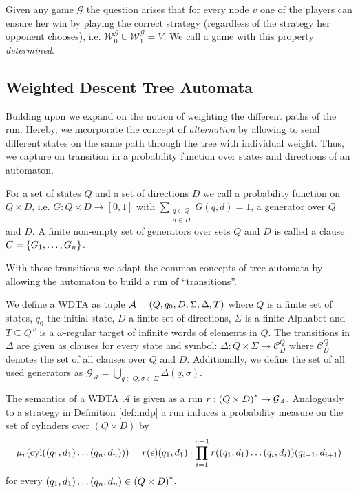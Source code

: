 Given any game $\mathcal{G}$ the question arises that for every node $v$ one of
the players can ensure her win by playing the correct strategy (regardless of
the strategy her opponent chooses), i.e.
$\mathcal{W}^{\mathcal{G}}_{0}\cup\mathcal{W}^{\mathcal{G}}_{1} = V$. We call
a game with this property \emph{determined}.

\subsection{Weighted Descent Tree Automata}
Building upon \cite{RandAutoInfTrees} we expand on the notion of weighting
the different paths of the run. Hereby, we incorporate the concept of
\emph{alternation} by allowing to send different states on the same path
through the tree with individual weight. Thus, we capture on transition in a
probability function over states and directions of an automaton.
\begin{definition}[Generator]
  For a set of states $Q$ and a set of directions $D$ we call a probability
  function on $Q\times D$, i.e. $G: Q\times D\rightarrow [0,1]$ with
  $\sum\limits_{\substack{q\in Q\\ d\in D}}G(q,d) = 1$, a generator over $Q$
  and $D$. A finite non-empty set of generators over sets $Q$ and $D$ is called
  a clause $C = \left\{G_{1},\dots,G_{n}\right\}$.
\end{definition}
With these transitions we adapt the common concepts of tree automata by
allowing the automaton to build a run of \enquote{transitions}.
\begin{definition}
  We define a \acl{WDTA} as tuple
  $\mathcal{A} = \left(Q, q_{0}, D, \Sigma, \Delta, T\right)$ where $Q$ is a finite
  set of states, $q_{0}$ the initial state, $D$ a finite set of directions,
  $\Sigma$ is a finite Alphabet and $T\subseteq Q^{\omega}$ is a
  $\omega$-regular target of infinite words of elements in $Q$. The transitions
  in $\Delta$ are given as clauses for every state and symbol:
  $\Delta:Q\times\Sigma\rightarrow\mathcal{C}^{Q}_{D}$
  where $\mathcal{C}^{Q}_{D}$ denotes the set of all clauses over $Q$ and $D$.
  Additionally, we define the set of all used generators as
  $\mathcal{G}_{\mathcal{A}} = \bigcup\limits_{q\in Q,\sigma\in\Sigma}
    \Delta(q,\sigma)$.
\end{definition}
The semantics of a \ac{WDTA} $\mathcal{A}$ is given as a run
$r:\left(Q\times D\right)^{*}\rightarrow \mathcal{G}_{\mathcal{A}}$. Analogously to
a strategy in Definition \ref{def:mdp} a run induces a probability measure on
the set of cylinders over $(Q\times D)$ by
\begin{equation}
  \mu_{r}(\operatorname{cyl}(\left(q_{1},d_{1}\right)\dots\left(q_{n},d_{n}\right)))
    = r(\epsilon)(q_{1},d_{1})\cdot\prod\limits_{i = 1}^{n - 1}
    r(\left(q_{1},d_{1}\right)\dots\left(q_{i},d_{i}\right))(q_{i+1},d_{i+1})
\end{equation}
for every $\left(q_{1},d_{1}\right)\dots\left(q_{n},d_{n}\right)\in\left(Q\times D\right)^{*}$.

